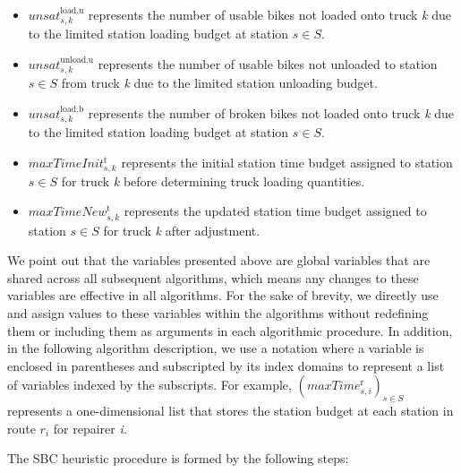 \begin{itemize}
  assigned to station \(s \in S\) for truck \(k \in K\).
\item
  \(\mathit{unsa}t_{s,k}^{\text{load,u}}\) represents the number of usable bikes not loaded onto
  truck \emph{k} due to the limited station loading budget at station \(s \in S\).
\item
  \(\mathit{unsa}t_{s,k}^{\text{unload,u}}\) represents the number of usable bikes not unloaded to
  station \(s \in S\) from truck \emph{k} due to the limited station unloading budget.
\item
  \(\mathit{unsa}t_{s,k}^{\text{load},\text{b}}\) represents the number of broken bikes not loaded
  onto truck \emph{k} due to the limited station loading budget at station \(s \in S\).
\item
  \(\mathit{maxTimeIni}t_{s,k}^{\text{t}}\) represents the initial station time budget assigned to
  station \(s \in S\) for truck \emph{k} before determining truck loading quantities.
\item
  \(\mathit{maxTimeNe}w_{s,k}^{\text{t}}\) represents the updated station time budget assigned to
  station \(s \in S\) for truck \emph{k} after adjustment.
\end{itemize}

We point out that the variables presented above are global variables that are shared across all
subsequent algorithms, which means any changes to these variables are effective in all algorithms.
For the sake of brevity, we directly use and assign values to these variables within the algorithms
without redefining them or including them as arguments in each algorithmic procedure. In addition,
in the following algorithm description, we use a notation where a variable is enclosed in
parentheses and subscripted by its index domains to represent a list of variables indexed by the
subscripts. For example, \(\left( {\mathit{maxTim}e_{s,i}^{\text{r}}} \right)_{s \in S}\) represents
a one-dimensional list that stores the station budget at each station in route \(r_{i}\) for
repairer \emph{i.}

The SBC heuristic procedure is formed by the following steps:

